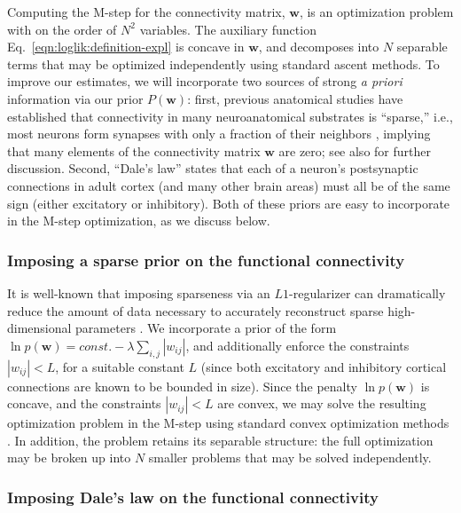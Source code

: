 \documentclass[aoas,preprint]{imsart}
\newcommand{\w}{w}
\newcommand{\bw}{\mathbf{\w}}
\begin{document}
Computing the M-step for the connectivity matrix, $\bw$, is an optimization problem with on the order of $N^2$ variables. The auxiliary function Eq.~\eqref{eqn:loglik:definition-expl} is concave in $\bw$, and decomposes into $N$ separable terms that may be optimized independently using standard ascent methods. To improve our estimates, we will incorporate two sources of strong \emph{a priori} information via our prior $P(\bw)$: first, previous anatomical studies have established that connectivity in many neuroanatomical substrates is ``sparse,'' i.e., most neurons form synapses with only a fraction of their neighbors \cite{Buhl94,Thompson88,Reyes98,Feldmeyer99,Gupta00,FeldmeyerSakmann00,PetersenSakmann00,Binzegger04,Song2005,Mishchenko2009b}, implying that many elements of the connectivity matrix $\bw$ are zero; see also \cite{PAN04c,Rigat06,PILL07,Stevenson08} for further discussion. Second, ``Dale's law'' states that each of a neuron's postsynaptic connections in adult cortex (and many other brain areas) must all be of the same sign (either excitatory or inhibitory). Both of these priors are easy to incorporate in the M-step optimization, as we discuss below.


\subsubsection{Imposing a sparse prior on the functional connectivity}

It is well-known that imposing sparseness via an $L1$-regularizer can
dramatically reduce the amount of data necessary to accurately
reconstruct sparse high-dimensional parameters
\cite{Tibs96,TIP01,DE03,NG04,Candes2005,Mishchenko2009}. We
incorporate a prior of the form $\ln p(\bw) = const. - \lambda
\sum_{i,j} |\w_{ij}|$, and additionally enforce the constraints
$|\w_{ij}|<L$, for a suitable constant $L$ (since both excitatory and
inhibitory cortical connections are known to be bounded in
size). Since the penalty $\ln p(\bw)$ is concave, and the constraints
$|\w_{ij}|<L$ are convex, we may solve the resulting optimization
problem in the M-step using standard convex optimization methods
\cite{CONV04}. In addition, the problem retains its separable
structure: the full optimization may be broken up into $N$ smaller
problems that may be solved independently.

\subsubsection{Imposing Dale's law on the functional connectivity}
\end{document}
